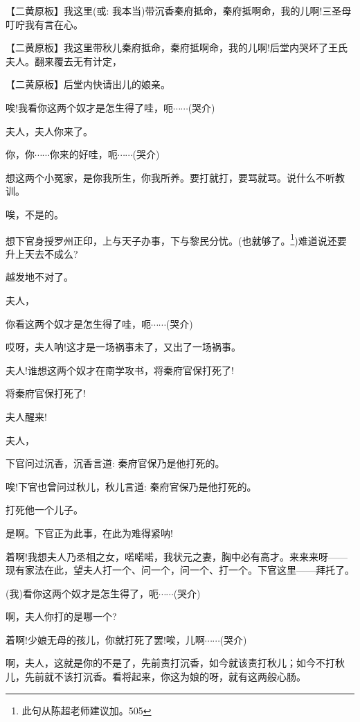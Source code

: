 \setlength{\hangindent}{60pt} {【{\akai 二黄原板}】我这里({\akai 或}: 我本当)带沉香秦府抵命，秦府抵啊命，我的儿啊!三圣母叮咛我有言在心。}

\setlength{\hangindent}{60pt} {【{\akai 二黄原板}】我这里带秋儿秦府抵命，秦府抵啊命，我的儿啊!后堂内哭坏了王氏夫人。翻来覆去无有计定，}

\setlength{\hangindent}{60pt} {【{\akai 二黄原板}】后堂内快请出儿的娘亲。}

{唉!我看你这两个奴才是怎生得了哇，呃$\cdots{}\cdots{}$(哭介)}

{夫人，夫人你来了。}

{你，你$\cdots{}\cdots{}$你来的好哇，呃$\cdots{}\cdots{}$(哭介)}

{想这两个小冤家，是你我所生，你我所养。要打就打，要骂就骂。说什么不听教训。}

{唉，不是的。}

{想下官身授罗州正印，上与天子办事，下与黎民分忧。(}也就够了。\footnote{ 此句从陈超老师建议加。{505}}{)难道说还要升上天去不成么?}

{越发地不对了。}

{夫人，}

{你看这两个奴才是怎生得了哇，呃$\cdots{}\cdots{}$(哭介)}

{哎呀，夫人呐!这才是一场祸事未了，又出了一场祸事。}

{夫人!谁想这两个奴才在南学攻书，将秦府官保打死了!}

{将秦府官保打死了!}

{夫人醒来!}

{夫人，}

{下官问过沉香，沉香言道: 秦府官保乃是他打死的。}

{唉!下官也曾问过秋儿，秋儿言道: 秦府官保乃是他打死的。}

{打死他一个儿子。}

{是啊。下官正为此事，在此为难得紧呐!}

{着啊!我想夫人乃丞相之女，喏喏喏，我状元之妻，胸中必有高才。来来来呀------现有家法在此，望夫人打一个、问一个，问一个、打一个。下官这里------拜托了。}

{(我)看你这两个奴才是怎生得了，呃$\cdots{}\cdots{}$(哭介)}

{啊，夫人你打的是哪一个?}

{着啊!少娘无母的孩儿，你就打死了罢!唉，儿啊$\cdots{}\cdots{}$(哭介)}

{啊，夫人，这就是你的不是了，先前责打沉香，如今就该责打秋儿；如今不打秋儿，先前就不该打沉香。看将起来，你这为娘的呀，就有这两般心肠。}


